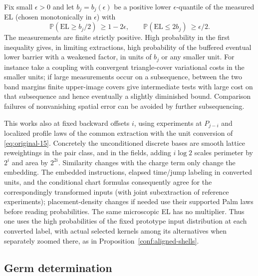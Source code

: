 Fix small \(\epsilon>0\) and let \(b_j=b_j(\epsilon)\) be a positive lower \(\epsilon\)-quantile of
the measured EL (chosen monotonically in \(\epsilon\)) with
\[
 \mathbb P(\mathrm{EL}\ge b_j/2)\ \ge 1-2\epsilon,\qquad
 \mathbb P(\mathrm{EL}\le 2 b_j)\ \ge\epsilon/2.
\]
The measurements are finite strictly positive. High probability in the first inequality gives, in
limiting extractions, high probability of the buffered eventual lower barrier with a weakened
factor, in units of \(b_j\) or any smaller unit. For instance take a coupling with convergent
triangle-cover variational costs in the smaller units; if large measurements occur on a subsequence,
between the two band margins finite upper-image covers give intermediate tests with large cost on
that subsequence and hence eventually a slightly diminished bound. Comparison failures of
nonvanishing spatial error can be avoided by further subsequencing.

This works also at fixed backward offsets \(i\), using experiments at \(P_{j-i}\) and localized
profile laws of the common extraction with the unit conversion of \eqref{eq:original-15}. Concretely
the unconditioned discrete bases are smooth lattice reweightings in the pair class, and in the
fields, adding \(i\log 2\) scales perimeter by \(2^i\) and area by \(2^{2i}\). Similarity changes
with the charge term only change the embedding. The embedded instructions, elapsed time/jump
labeling in converted units, and the conditional chart formulas consequently agree for the
correspondingly transformed inputs (with joint subextraction of reference experiments);
placement-density changes if needed use their supported Palm laws before reading probabilities. The
same microscopic EL has no multiplier. Thus one uses the high probabilities of the fixed prototype
input distribution at each converted label, with actual selected kernels among its alternatives when
separately zoomed there, as in Proposition~\ref{conf:aligned-shells}.

\subsection{Germ determination}
\label{conf:germs}

